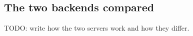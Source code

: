 \IfFileExists{IEEEtran.cls}{\ieeetrue\documentclass[conference]{IEEEtran}}{\ieeefalse\documentclass[twocolumn,10pt]{article}}
\begin{document}
\subsection{The two backends compared}
TODO: write how the two servers work and how they differ.
\end{document}

